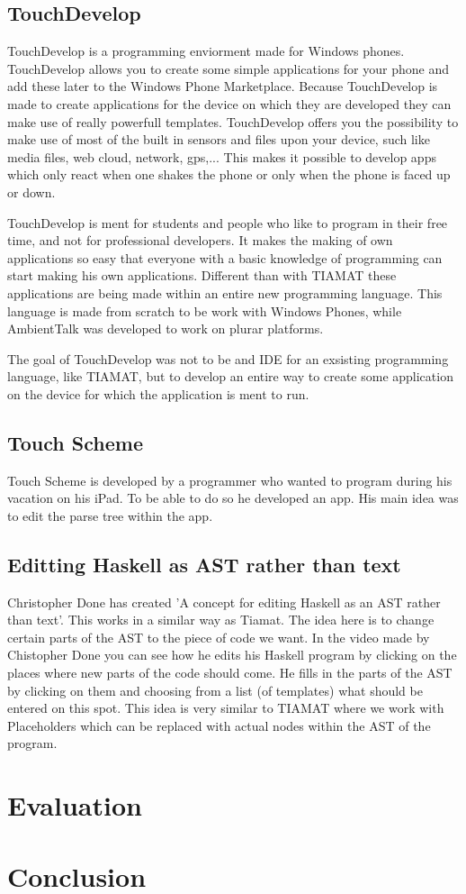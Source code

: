 \documentclass[a4paper,12pt]{report}
\begin{document}
\section{TouchDevelop}
TouchDevelop is a programming enviorment made for Windows phones. TouchDevelop allows you to create some simple applications for your phone and add these later to the Windows Phone Marketplace. 
Because TouchDevelop is made to create applications for the device on which they are developed they can make use of really powerfull templates. TouchDevelop offers you the possibility to make use 
of most of the built in sensors and files upon your device, such like media files, web cloud, network, gps,... This makes it possible to develop apps which only react when one shakes the phone or
only when the phone is faced up or down.

TouchDevelop is ment for students and people who like to program in their free time, and not for professional developers. It makes the making of own applications so easy that everyone with a 
basic knowledge of programming can start making his own applications. Different than with TIAMAT these applications are being made within an entire new programming language. This language
is made from scratch to be work with Windows Phones, while AmbientTalk was developed to work on plurar platforms.

The goal of TouchDevelop was not to be and IDE for an exsisting programming language, like TIAMAT, but to develop an entire way to create some application on the device for which the application
is ment to run.  
\section{Touch Scheme}
Touch Scheme is developed by a programmer who wanted to program during his vacation on his iPad. To be able to do so he developed an app. His main idea was to edit the parse tree within the app.
\section{Editting Haskell as AST rather than text}
Christopher Done has created 'A concept for editing Haskell as an AST rather than text'. This works in a similar way as Tiamat. The idea here is to change certain parts of the AST to the piece of 
code we want. In the video made by Chistopher Done you can see how he edits his Haskell program by clicking on the places where new parts of the code should come. He fills in the parts of the AST
by clicking on them and choosing from a list (of templates) what should be entered on this spot.
This idea is very similar to TIAMAT where we work with Placeholders which can be replaced with actual nodes within the AST of the program.
\chapter{Evaluation}
\chapter{Conclusion}
\end{document}
